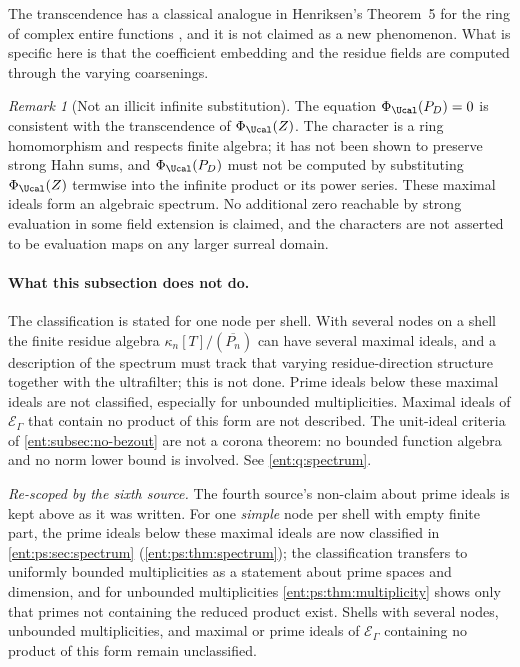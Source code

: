 \documentclass[11pt]{article}
\theoremstyle{plain}
\theoremstyle{plain}
\theoremstyle{plain}
\theoremstyle{definition}
\theoremstyle{definition}
\theoremstyle{definition}
\theoremstyle{definition}
\theoremstyle{remark}
\newtheorem{remark}[remark]{Remark}
\newcommand{\E}{\mathcal E_\Gamma}
\begin{document}
The transcendence has a classical analogue in Henriksen's Theorem~5 for the
ring of complex entire functions \cite{Henriksen}, and it is not claimed as a
new phenomenon. What is specific here is that the coefficient embedding and
the residue fields are computed through the varying coarsenings.

\begin{remark}[Not an illicit infinite substitution]
\label{ent:sm:rem:no-substitution}
The equation $\Phi_\Ucal(P_D)=0$ is consistent with the transcendence of
$\Phi_\Ucal(Z)$. The character is a ring homomorphism and respects finite
algebra; it has not been shown to preserve strong Hahn sums, and
$\Phi_\Ucal(P_D)$ must not be computed by substituting $\Phi_\Ucal(Z)$
termwise into the infinite product or its power series. These maximal ideals
form an algebraic spectrum. No additional zero reachable by strong
evaluation in some field extension is claimed, and the characters are not
asserted to be evaluation maps on any larger surreal domain.
\end{remark}

\paragraph{What this subsection does not do.}
The classification is stated for one node per shell. With several nodes on a
shell the finite residue algebra $\kappa_n[T]/(\overline{P_n})$ can have
several maximal ideals, and a description of the spectrum must track that
varying residue-direction structure together with the ultrafilter; this is
not done. Prime ideals below these maximal ideals are not classified,
especially for unbounded multiplicities. Maximal ideals of $\E$ that contain
no product of this form are not described. The unit-ideal criteria of
\cref{ent:subsec:no-bezout} are not a corona theorem: no bounded function
algebra and no norm lower bound is involved. See \cref{ent:q:spectrum}.

\emph{Re-scoped by the sixth source.} The fourth source's non-claim about
prime ideals is kept above as it was written. For one \emph{simple} node per
shell with empty finite part, the prime ideals below these maximal ideals are
now classified in \cref{ent:ps:sec:spectrum}
(\cref{ent:ps:thm:spectrum}); the classification transfers to uniformly
bounded multiplicities as a statement about prime spaces and dimension, and
for unbounded multiplicities \cref{ent:ps:thm:multiplicity} shows only that
primes not containing the reduced product exist. Shells with several nodes,
unbounded multiplicities, and maximal or prime ideals of $\E$ containing no
product of this form remain unclassified.
\end{document}
